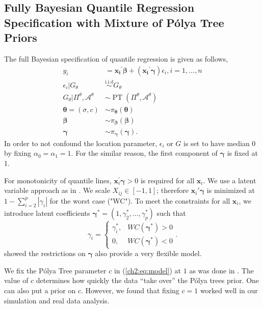 \documentclass[12pt]{article}
\newcommand{\polya}{P\'{o}lya}
\newcommand{\iid}{\stackrel{\mbox{i.i.d}}{\sim}}
\DeclareMathOperator{\pt}{PT}
\begin{document}
\subsection{Fully Bayesian Quantile Regression Specification with
  Mixture of \polya{} Tree Priors}\label{ch2:sec:bayesmodel}
The full Bayesian specification of quantile regression is given as
follows,
\begin{equation}\label{ch2:eq:model}
\begin{aligned}
  y_i& = \bm{x_i}^{\prime}\bm{\beta} + (\bm{x_i}^{\prime}\bm{\gamma}) \epsilon_{i}, i = 1,
  \ldots,
  n \\
  \epsilon_i |G_{\theta} & \iid G_{\theta} \\
  G_{\theta}|\Pi^{\theta}, \mathcal{A}^{\theta} & \sim \pt
  (\Pi^{\theta}, \mathcal{A}^{\theta}) \\
  \bm{\theta} = (\sigma, c) & \sim \pi_{\bm \theta}(\bm \theta) \\
  \bm{\beta} & \sim \pi_{\bm \beta}(\bm \beta)\\
  \bm{\gamma} &\sim \pi_{\bm \gamma}(\bm \gamma).
\end{aligned}
\end{equation}
In order to not confound the location parameter, $\epsilon_i $ or $G$
is set to have median 0 by fixing $\alpha_0=\alpha_1 = 1$. For the
similar reason, the first component of $\bm{\gamma}$ is fixed at 1.

For monotonicity of quantile lines, $\bm x_i^{\prime} \bm \gamma > 0$ is required for all $\bm x_i$.
We use a latent variable approach as in \citet{reich2011}.
We scale $X_{ij} \in [-1, 1]$; therefore $\bm x_i\prime \bm \gamma$ is minimized at $1 - \sum_{i = 2}^{p} |\gamma_i|$ for the worst case ("WC").
To meet the constraints for all $\bm x_i$, we introduce latent coefficients $\bm \gamma^{*} = (1, \gamma_2^{*}, \ldots, \gamma_p^{*})$ such that
\begin{displaymath}
\gamma_i =
\begin{cases}
\gamma_i^{*}, & WC(\bm \gamma^{*}) > 0 \\
0,            & WC(\bm \gamma^{*} ) < 0
\end{cases}.
\end{displaymath}
\citet{reich2013} showed the restrictions on $\bm \gamma$ also provide a very flexible model.

We fix the \polya{} Tree parameter $c$ in (\ref{ch2:eq:model}) at $1$ as was done in \citet{hanson2006}.
The value of $c$ determines how quickly the data ``take over'' the \polya{} trees prior.
One can also put a prior on $c$.
However, we found that fixing $c = 1$ worked well in our simulation and real data analysis.
\end{document}
